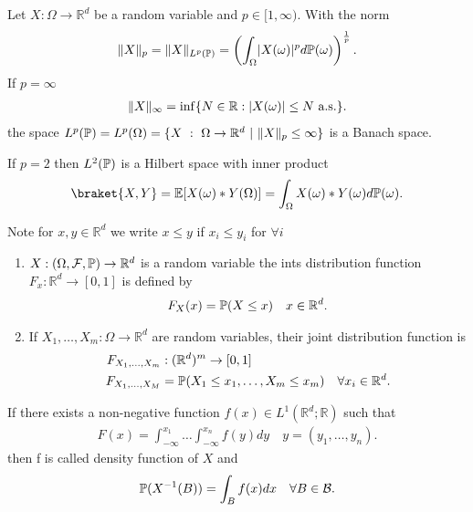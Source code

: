 \begin{definition}[$L^p$ spaces]
  Let $X : \Omega  \to  \mathbb{R}^{d} $  be a random variable and $p \in [1,\infty)$.
  With the norm 
  \begin{align*}
    \|X\|_p = \|X\|_{L^{p}(\P ) } = \left( \int_{\Omega} \abs{X(\omega )}^{p} d\P(\omega )  \right)^{\frac{1}{p}} 
  .\end{align*}
  If $p=\infty$ 
  \begin{align*}
    \|X\|_{\infty} = \inf \{N \in  \mathbb{R} : \abs{X(\omega )} \le  N \text{ a.s.}\}  
  .\end{align*}
  the space $L^{p}(\P ) = L^{p}(\Omega ) = \{X \ : \ \Omega  \to  \mathbb{R}^{d}  \ | \ \|X\|_p \le \infty \}    $ is a Banach space.
\end{definition}
\begin{remark}
 If $p=2$ then $L^{2}(\P) $ is a Hilbert space with inner product 
 \begin{align*}
   \braket{X,Y} = \E[X(\omega )*Y(\Omega )] = \int_{\Omega }X(\omega )*Y(\omega )d\P(\omega )
 .\end{align*}
\end{remark}
\begin{definition}
 Note for $x,y \in  \mathbb{R}^{d} $  we write $x\le y$ if $x_i \le  y_i$ for $\forall i$
 \begin{enumerate}
   \item $X: (\Omega ,\mathcal{F},\P) \to \mathbb{R}^{d} $ is a random variable the ints distribution function $F_x : \mathbb{R}^{d} \to [0,1] $
     is defined by 
     \begin{align*}
      F_X(x) = \P(X\le x) \quad x \in  \mathbb{R}^{d} 
     .\end{align*}
    \item If $X_{1},\ldots ,X_m : \Omega \to \mathbb{R}^{d} $ are random variables, their joint distribution function is
      \begin{align*}
        F_{X_{1},\ldots ,X_m} &: (\mathbb{R}^{d} )^m \to [0,1]\\
        F_{X_{1},\ldots ,X_M} &= \P(X_{1}\le x_{1},\ldots ,X_m\le x_m) \quad \forall x_i \in \mathbb{R}^{d} 
      .\end{align*}
 \end{enumerate}
\end{definition}
\begin{definition}
 If there exists a non-negative function $f(x) \in  L^{1}(\mathbb{R}^{d} ; \mathbb{R} ) $   such that 
 \begin{align*}
   F(x) = \int_{-\infty}^{x_{1}}  \ldots \int_{-\infty}^{x_n} f(y) dy \quad y = (y_{1},\ldots ,y_n)
 .\end{align*}
 then f is called density function of $X$ and 
 \begin{align*}
  \P(X^{-1}(B) ) = \int_B f(x) dx \quad \forall  B \in  \mathcal{B}
 .\end{align*}
\end{definition}

